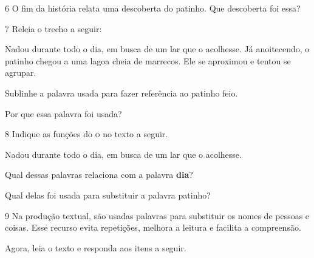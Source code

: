 \num{6} O fim da história relata uma descoberta do patinho. Que descoberta
foi essa?


\num{7} Releia o trecho a seguir:

\begin{myquote}
Nadou durante todo o dia, em busca de um lar que o acolhesse. Já
anoitecendo, o patinho chegou a uma lagoa cheia de marrecos. Ele
se aproximou e tentou se agrupar.
\end{myquote}

\begin{escolha}
\item Sublinhe a palavra usada para fazer referência ao patinho feio.\\

\item Por que essa palavra foi usada?\\
\end{escolha}

\num{8} Indique as funções do \textsc{o} no texto a seguir.

\begin{myquote}
Nadou durante todo o dia, em busca de um lar que o acolhesse.
\end{myquote}

\begin{escolha}
\item Qual dessas palavras relaciona com a palavra \textbf{dia}?\\

\item Qual delas foi usada para substituir a palavra patinho?\\
\end{escolha}

\num{9} Na produção textual, são usadas palavras para substituir 
os nomes de pessoas e coisas. Esse recurso evita repetições,
melhora a leitura e facilita a compreensão. 

Agora, leia o texto e responda aos itens a seguir.


